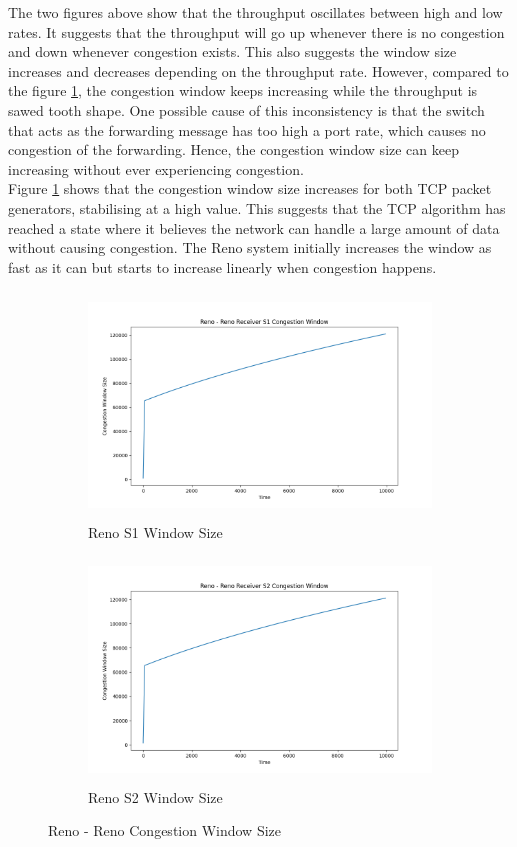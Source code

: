 \documentclass[12pt,a4paper]{report}
\begin{document}
\break
\noindent The two figures above show that the throughput oscillates between high and low rates. It suggests that the throughput will go up whenever there is no congestion and down whenever congestion exists. This also suggests the window size increases and decreases depending on the throughput rate. However, compared to the figure \ref{fig: result_rr_2}, the congestion window keeps increasing while the throughput is sawed tooth shape. One possible cause of this inconsistency is that the switch that acts as the forwarding message has too high a port rate, which causes no congestion of the forwarding. Hence, the congestion window size can keep increasing without ever experiencing congestion.\\
Figure \ref{fig: result_rr_2} shows that the congestion window size increases for both TCP packet generators, stabilising at a high value. This suggests that the TCP algorithm has reached a state where it believes the network can handle a large amount of data without causing congestion. The Reno system initially increases the window as fast as it can but starts to increase linearly when congestion happens.\\
\begin{figure}[!ht]
\begin{subfigure}{0.5\textwidth}
\includegraphics[width=1\linewidth, height=6cm]{Pictures/S1_Reno_Window.png} 
\caption{Reno S1 Window Size}
\end{subfigure}
\begin{subfigure}{0.5\textwidth}
\includegraphics[width=1\linewidth, height=6cm]{Pictures/S2_Reno_Window.png}
\caption{Reno S2 Window Size}
\end{subfigure}
\caption{Reno - Reno Congestion Window Size}
\label{fig: result_rr_2}
\end{figure}
\end{document}

